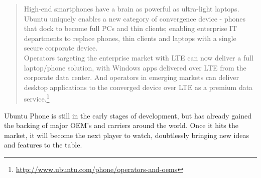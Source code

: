 \begin{quotation}
High-end smartphones have a brain as powerful as ultra-light laptops. Ubuntu uniquely enables a new category of convergence device - phones that dock to become full PCs and thin clients; enabling enterprise IT departments to replace phones, thin clients and laptops with a single secure corporate device.\\

Operators targeting the enterprise market with LTE can now deliver a full laptop/phone solution, with Windows apps delivered over LTE from the corporate data center. And operators in emerging markets can deliver desktop applications to the converged device over LTE as a premium data service.\footnote{\url{http://www.ubuntu.com/phone/operators-and-oems}}
\end{quotation}


Ubuntu Phone is still in the early stages of development, but has already gained the backing of major OEM's and carriers around the world. Once it hits the market, it will become the next player to watch, doubtlessly bringing new ideas and features to the table.  
















 